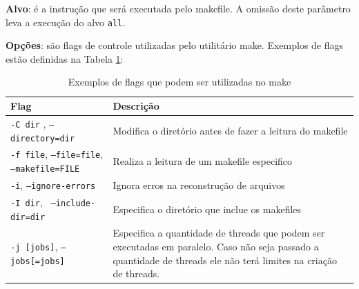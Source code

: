 \textbf{Alvo}: é a instrução que será executada pelo makefile. 
A omissão deste parâmetro leva a execução do alvo \texttt{all}.
    
\textbf{Opções}: são flags de controle utilizadas pelo utilitário make.
 Exemplos de flags estão definidas na Tabela \ref{tab:tabela_05}:

\begin{table}[h]
    \centering
    \caption {Exemplos de flags que podem ser utilizadas no make}
    \label{tab:tabela_05}
    \begin{tabular}{ lp{8cm}}
    \toprule
    \textbf{Flag} & \textbf{Descrição}\\
    \midrule
    \texttt{-C dir} , \texttt{--directory=dir} & Modifica o diretório antes de fazer a leitura do makefile\\
    \midrule
    \texttt{-f file}, \texttt{--file=file}, \texttt{--makefile=FILE} & Realiza a leitura de um makefile especifico\\
    \midrule
    \texttt{-i}, \texttt{--ignore-errors} & Ignora erros na reconstrução de arquivos\\
    \midrule
    \texttt{-I dir}, \texttt{ --include-dir=dir} & Especifica o diretório que inclue os makefiles\\
    \midrule
    \texttt{-j [jobs]}, \texttt{--jobs[=jobs]} & Especifica a quantidade de threads
                                 que podem ser executadas em paralelo. 
                                 Caso não seja passado a quantidade de
                                 threads ele não terá limites na criação
                                 de threads.\\
    \bottomrule
    \end{tabular}
\end{table}
